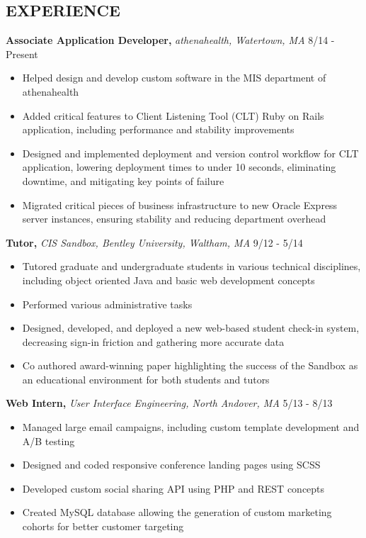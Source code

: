 \documentclass[line, margin]{res}
\begin{document}
\begin{resume}
\section{EXPERIENCE}
\textbf{Associate Application Developer,} \textit{athenahealth, Watertown, MA} \hfill 8/14 - Present
\begin{itemize}
    \item Helped design and develop custom software in the MIS department of athenahealth
    \item Added critical features to Client Listening Tool (CLT) Ruby on Rails application, including performance and stability improvements
    \item Designed and implemented deployment and version control workflow for CLT application, lowering deployment times to under 10 seconds, eliminating downtime, and mitigating key points of failure
    \item Migrated critical pieces of business infrastructure to new Oracle Express server instances, ensuring stability and reducing department overhead
\end{itemize}
\textbf{Tutor,} \textit{CIS Sandbox, Bentley University, Waltham, MA} \hfill 9/12 - 5/14
\begin{itemize}
    \item Tutored graduate and undergraduate students in various technical disciplines, including object oriented Java and basic web development concepts
    \item Performed various administrative tasks
    \item Designed, developed, and deployed a new web-based student check-in system, decreasing sign-in friction and gathering more accurate data
    \item Co authored award-winning paper highlighting the success of the Sandbox as an educational environment for both students and tutors
\end{itemize}
\textbf{Web Intern,} \textit{User Interface Engineering, North Andover, MA} \hfill 5/13 - 8/13
\begin{itemize}
    \item Managed large email campaigns, including custom template development and A/B testing
    \item Designed and coded responsive conference landing pages using SCSS
    \item Developed custom social sharing API using PHP and REST concepts
    \item Created MySQL database allowing the generation of custom marketing cohorts for better customer targeting

\end{itemize}
\end{resume}
\end{document}
